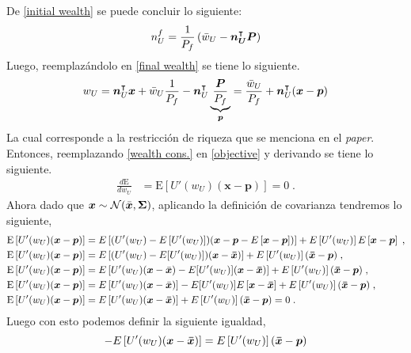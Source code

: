 \documentclass{article}
\begin{document}
De \eqref{initial wealth} se puede concluir lo siguiente:
\begin{equation*}
    n^{f}_{U}= \frac{1}{P_{f}}\left(\Bar{w}_{U} - \bm{n^{\intercal}_{U}}\bm{P}\right)
\end{equation*}
Luego, reemplazándolo en \eqref{final wealth} se tiene lo siguiente.
\begin{equation}
    w_{U} = \bm{n^{\intercal}}_{U}\bm{x} + \Bar{w}_{U}\frac{1}{P_{f}} -\bm{n^{\intercal}}_{U}\underbrace{\frac{\bm{P}}{P_{f}}}_{\bm{p}} = \frac{\Bar{w}_{U}}{P_{f}} + \bm{n^{\intercal}}_{U}(\bm{x}-\bm{p}) \label{wealth cons.}
\end{equation}
La cual corresponde a la restricción de riqueza que se menciona en el \textit{paper}. Entonces, reemplazando \eqref{wealth cons.} en \eqref{objective} y derivando se tiene lo siguiente.
\begin{equation*}
    \begin{split}
        \frac{d\mathrm{E}}{dw_{U}} &= \mathrm{E}\left[U'(w_{U})(\bm{x}-\bm{p})\right]=0\;.
    \end{split}
\end{equation*}
Ahora dado que $\bm{x}\sim\mathcal{N}(\Bar{\bm{x}},\bm{\Sigma})$, aplicando la definición de covarianza tendremos lo siguiente,
\begin{equation*}
	\begin{split}
		\mathrm{E}\left[U'(w_{U})(\bm{x}-\bm{p})\right] &= E\left[(U'(w_U)-E\left[U'(w_U)\right])(\bm{x}-\bm{p}-E\left[\bm{x}-\bm{p}\right])\right] + E\left[U'(w_U)\right]E\left[\bm{x}-\bm{p}\right]\;,\\
		\mathrm{E}\left[U'(w_{U})(\bm{x}-\bm{p})\right] &= E\left[(U'(w_U)-E[U'(w_U)])(\bm{x}-\bm{\Bar{x}})\right]+ E\left[U'(w_U)\right](\bm{\Bar{x}}-\bm{p})\;,\\
		\mathrm{E}\left[U'(w_{U})(\bm{x}-\bm{p})\right] &= E\left[U'(w_U)(\bm{x}-\Bar{\bm{x}})-E[U'(w_U)](\bm{x}-\bm{\Bar{x}})\right]+ E\left[U'(w_U)\right](\bm{\Bar{x}}-\bm{p})\;,\\
		\mathrm{E}\left[U'(w_{U})(\bm{x}-\bm{p})\right] &= E\left[U'(w_U)(\bm{x}-\Bar{\bm{x}})\right]-E[U'(w_U)]E\left[\bm{x}-\bm{\Bar{x}}\right]+ E\left[U'(w_U)\right](\bm{\Bar{x}}-\bm{p})\;,\\
		\mathrm{E}\left[U'(w_{U})(\bm{x}-\bm{p})\right] &= E\left[U'(w_U)(\bm{x}-\bm{\Bar{x}})\right]+ E\left[U'(w_U)\right](\bm{\Bar{x}}-\bm{p})=0\;.
	\end{split}
\end{equation*}
Luego con esto podemos definir la siguiente igualdad,
\begin{equation*}
	-E\left[U'(w_U)(\bm{x}-\bm{\Bar{x}})\right]= E\left[U'(w_U)\right](\bm{\Bar{x}}-\bm{p})
\end{equation*}
\end{document}

